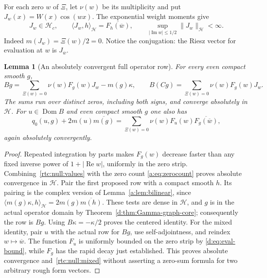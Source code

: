 \documentclass[11pt,a4paper]{article}
\numberwithin{equation}{section}
\newtheorem{lemma}[theorem]{Lemma}
\theoremstyle{definition}\newtheorem{definition}[theorem]{Definition}
\theoremstyle{remark}\newtheorem{remark}[theorem]{Remark}
\newcommand{\Hh}{\mathcal H}\newcommand{\Hw}{\mathcal H}
\newcommand{\ip}[2]{\langle#1,#2\rangle}\newcommand{\norm}[1]{\lVert#1\rVert}\newcommand{\abs}[1]{\lvert#1\rvert}
\begin{document}
For each zero $w$ of $\Xi$, let $\nu(w)$ be its multiplicity and put
$J_w(x)=W(x)\cos(wx)$.  The exponential weight moments give
\begin{equation}\label{rtc:null:values}
 J_w\in\Hh_c,\qquad
 \ip{J_w}{h}_{\Hh}=\overline{F_h(\overline w)},\qquad
 \sup_{|\operatorname{Im}w|\le1/2}\norm{J_w}_{\Hh}<\infty.
\end{equation}
Indeed $m(J_w)=\Xi(w)/2=0$.  Notice the conjugation: the Riesz vector
for evaluation at $w$ is $J_{\overline w}$.

\begin{lemma}[An absolutely convergent full operator row]\label{rtc:null:row}
For every even compact smooth $g$,
\begin{equation}\label{rtc:null:row-identity}
 Bg=\sum_{\Xi(w)=0}\nu(w)F_g(w)J_w-m(g)\kappa,\qquad
 B(Cg)=\sum_{\Xi(w)=0}\nu(w)F_g(w)J_w.
\end{equation}
The sums run over distinct zeros, including both signs, and converge
absolutely in $\Hh$.
For $u\in\operatorname{Dom}B$ and even compact smooth $g$ one also has
\begin{equation}\label{rtc:null:mixed}
 q_0(u,g)+2m(u)\overline{m(g)}
 =\sum_{\Xi(w)=0}\nu(w)F_u(w)\overline{F_g(\overline w)},
\end{equation}
again absolutely convergently.
\end{lemma}
\begin{proof}
Repeated integration by parts makes $F_g(w)$ decrease faster than any
fixed inverse power of $1+|\operatorname{Re}w|$, uniformly in the zero
strip.  Combining~\eqref{rtc:null:values} with the zero count
\eqref{a:eq:zerocount} proves absolute convergence in $\Hh$.
Pair the first proposed row with a compact smooth $h$.  Its pairing is
the complex version of Lemma~\ref{a:lem:bilinear}, since
$\ip{m(g)\kappa}{h}_{\Hh}=2m(g)\overline{m(h)}$.
These tests are dense in $\Hh$, and $g$ is in the actual operator domain
by Theorem~\ref{d:thm:Gamma-graph-core}; consequently the row is $Bg$.
Using $B\kappa=-\kappa/2$ proves the centered identity.
For the mixed identity, pair $u$ with the actual row for $Bg$, use
self-adjointness, and reindex $w\mapsto\overline w$.
The function $F_u$ is uniformly bounded on the zero strip by
\eqref{d:eq:eval-bound}, while $F_g$ has the rapid decay just established.
This proves absolute convergence and~\eqref{rtc:null:mixed} without
asserting a zero-sum formula for two arbitrary rough form vectors.
\end{proof}
\end{document}
